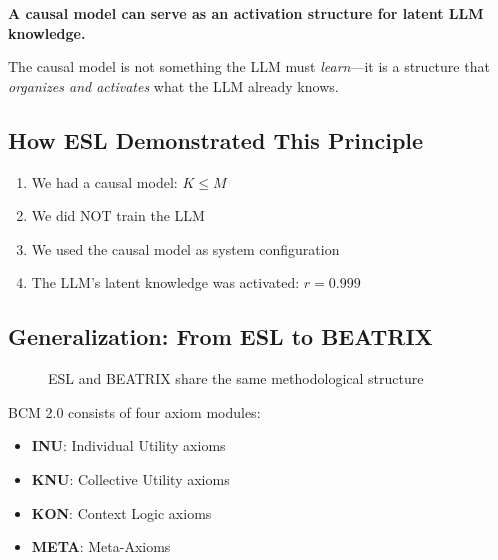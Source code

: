 \begin{principlebox}
\textbf{A causal model can serve as an activation structure for latent LLM knowledge.}

The causal model is not something the LLM must \emph{learn}---it is a structure that \emph{organizes and activates} what the LLM already knows.
\end{principlebox}


\subsection{How ESL Demonstrated This Principle}

\begin{enumerate}
    \item We had a causal model: $K \leq M$
    \item We did NOT train the LLM
    \item We used the causal model as system configuration
    \item The LLM's latent knowledge was activated: $r = 0.999$
\end{enumerate}


\subsection{Generalization: From ESL to BEATRIX}

\begin{figure}[H]
\centering
{}
\caption{ESL and BEATRIX share the same methodological structure}
\end{figure}

BCM 2.0 consists of four axiom modules:
\begin{itemize}
    \item \textbf{INU}: Individual Utility axioms
    \item \textbf{KNU}: Collective Utility axioms
    \item \textbf{KON}: Context Logic axioms
    \item \textbf{META}: Meta-Axioms
\end{itemize}


